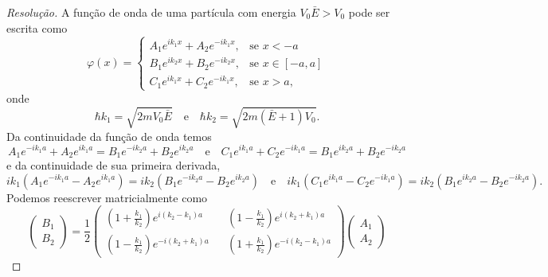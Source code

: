 \begin{proof}[Resolução]
    A função de onda de uma partícula com energia \(V_0 \bar{E} > V_0\) pode ser escrita como
    \begin{equation*}
        \varphi(x) = \begin{cases}
            A_1 e^{i k_1 x} + A_2 e^{-i k_1 x},&\text{se }x < -a\\
            B_1 e^{i k_2 x} + B_2 e^{-i k_2 x},&\text{se }x \in [-a,a]\\
            C_1 e^{i k_1 x} + C_2 e^{-i k_1 x},&\text{se }x > a,
        \end{cases}
    \end{equation*}
    onde
    \begin{equation*}
        \hbar k_1 = \sqrt{2m V_0 \bar{E}} \quad\text{e}\quad \hbar k_2 = \sqrt{2 m (\bar{E} + 1)V_0}.
    \end{equation*}
    Da continuidade da função de onda temos
    \begin{equation*}
        A_1 e^{-i k_1 a} + A_2 e^{ik_1 a} = B_1 e^{-ik_2 a} + B_2 e^{ik_2 a}
        \quad\text{e}\quad
        C_1 e^{i k_1 a} + C_2 e^{-ik_1 a} = B_1 e^{ik_2 a} + B_2 e^{-ik_2 a}
    \end{equation*}
    e da continuidade de sua primeira derivada,
    \begin{equation*}
        ik_1(A_1 e^{-i k_1 a} - A_2 e^{ik_1 a}) = ik_2(B_1 e^{-ik_2 a} - B_2 e^{ik_2 a})
        \quad\text{e}\quad
        ik_1(C_1 e^{i k_1 a} - C_2 e^{-ik_1 a}) = ik_2(B_1 e^{ik_2 a} - B_2 e^{-ik_2 a}).
    \end{equation*}
    Podemos reescrever matricialmente como
    \begin{equation*}
        \begin{pmatrix}
            B_1 \\
            B_2
        \end{pmatrix} = \frac12
        \begin{pmatrix}
            \left(1 + \frac{k_1}{k_2}\right)e^{i(k_2 - k_1)a} &&
            \left(1 - \frac{k_1}{k_2}\right)e^{i(k_2 + k_1)a} \\
            \left(1 - \frac{k_1}{k_2}\right)e^{-i(k_2 + k_1)a} &&
            \left(1 + \frac{k_1}{k_2}\right)e^{-i(k_2 - k_1)a}
        \end{pmatrix}
        \begin{pmatrix}
            A_1\\
            A_2
        \end{pmatrix}
    \end{equation*}

\end{proof}
